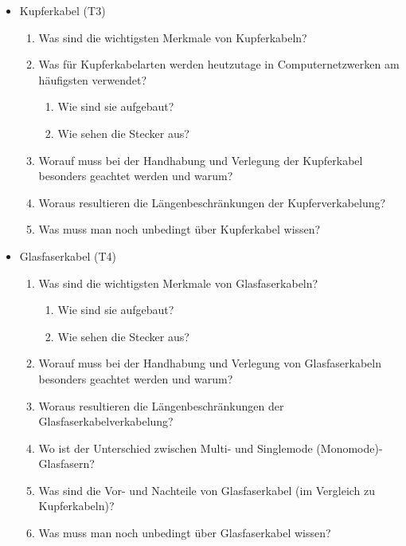 \begin{itemize}
    \item Kupferkabel (T3)
    \begin{enumerate}
        \item Was sind die wichtigsten Merkmale von Kupferkabeln?
        \item Was für Kupferkabelarten werden heutzutage in Computernetzwerken am häufigsten verwendet?
        \begin{enumerate}
            \item Wie sind sie aufgebaut?
            \item Wie sehen die Stecker aus?
        \end{enumerate}
        \item Worauf muss bei der Handhabung und Verlegung der Kupferkabel besonders geachtet werden und warum?
        \item Woraus resultieren die Längenbeschränkungen der Kupferverkabelung?
        \item Was muss man noch unbedingt über Kupferkabel wissen?\\
    \end{enumerate}

    \item Glasfaserkabel (T4)
    \begin{enumerate}
        \item Was sind die wichtigsten Merkmale von Glasfaserkabeln?
        \begin{enumerate}
            \item Wie sind sie aufgebaut?
            \item Wie sehen die Stecker aus?
        \end{enumerate}
        \item Worauf muss bei der Handhabung und Verlegung von Glasfaserkabeln besonders geachtet werden und warum?
        \item Woraus resultieren die Längenbeschränkungen der Glasfaserkabelverkabelung?
        \item Wo ist der Unterschied zwischen Multi- und Singlemode (Monomode)- Glasfasern?
        \item Was sind die Vor- und Nachteile von Glasfaserkabel (im Vergleich zu Kupferkabeln)?
        \item Was muss man noch unbedingt über Glasfaserkabel wissen?\\
    \end{enumerate}


\end{itemize}

